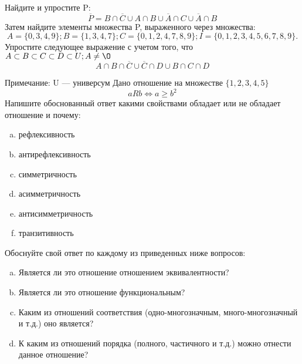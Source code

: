 \documentclass[10pt]{exam}
\begin{document}
\begin{questions}
\question
Найдите и упростите P:
\begin{equation*}
\overline{P} = B \cap \overline{C} \cup A \cap B \cup \overline{A} \cap C \cup \overline{A} \cap B
\end{equation*}
Затем найдите элементы множества P, выраженного через множества:
\begin{equation*}
A = \{0, 3, 4, 9\}; 
B = \{1, 3, 4, 7\};
C = \{0, 1, 2, 4, 7, 8, 9\};
I = \{0, 1, 2, 3, 4, 5, 6, 7, 8, 9\}.
\end{equation*}\question
Упростите следующее выражение с учетом того, что $A\subset B \subset C \subset D \subset U; A \neq \O$
\begin{equation*}
A \cap B  \cap \overline{C} \cup \overline{C} \cap D \cup B \cap C \cap D
\end{equation*}

Примечание: U — универсум\question
Дано отношение на множестве $\{1, 2, 3, 4, 5\}$ 
\begin{equation*}
aRb \iff a \geq b^2
\end{equation*}
Напишите обоснованный ответ какими свойствами обладает или не обладает отношение и почему:   
\begin{enumerate} [a)]\setcounter{enumi}{0}
\item рефлексивность
\item антирефлексивность
\item симметричность
\item асимметричность
\item антисимметричность
\item транзитивность
\end{enumerate}

Обоснуйте свой ответ по каждому из приведенных ниже вопросов:
\begin{enumerate} [a)]\setcounter{enumi}{0}
    \item Является ли это отношение отношением эквивалентности?
    \item Является ли это отношение функциональным?
    \item Каким из отношений соответствия (одно-многозначным, много-многозначный и т.д.) оно является?
    \item К каким из отношений порядка (полного, частичного и т.д.) можно отнести данное отношение?
\end{enumerate}



\end{questions}
\end{document}
